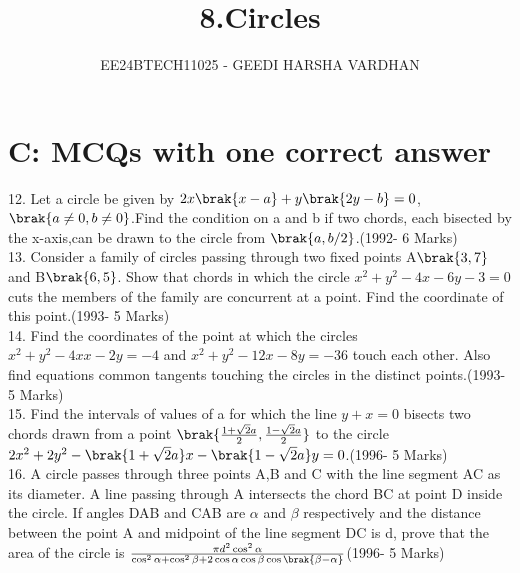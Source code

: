 \documentclass[journal,12pt,twocolumn]{IEEEtran}
\theoremstyle{remark}
\begin{document}

\vspace{3cm}

\title{8.Circles }
\author{EE24BTECH11025 - GEEDI HARSHA VARDHAN }
\maketitle
\newpage
\bigskip
\section{C: MCQs with one correct answer}

\renewcommand{\thefigure}{\theenumi}
\renewcommand{\thetable}{\theenumi}



12. Let a circle be given by $2x\brak{x-a}+y\brak{2y-b}=0$,$\brak{a\neq0,b\neq0}$.Find the condition on a and b if two chords, each bisected by the x-axis,can be drawn to the circle from $\brak{a,b/2}$.\hfill(1992- 6 Marks)\\




13. Consider a family of circles passing through two fixed points A$\brak{3,7}$ and B$\brak{6,5}$. Show that chords in which the circle $x^2+y^2-4x-6y-3=0$ cuts the members of the family are concurrent at a point. Find the coordinate of this point.\hfill(1993- 5 Marks)\\





14. Find the coordinates of the point at which the circles $x^2+y^2-4xx-2y=-4$ and $x^2+y^2-12x-8y=-36$ touch each other. Also find equations common tangents touching the circles in the distinct points.\hfill(1993- 5 Marks)\\


15. Find the intervals of values of a for which the line $y+x=0$ bisects two chords drawn from a point $\brak {\frac{1+\sqrt{2}a}{2},\frac{1-\sqrt{2}a}{2}}$ to the circle $2x^2+2y^2-\brak{1+\sqrt{2}a}x-\brak{1-\sqrt{2}a}y=0$.\hfill(1996- 5 Marks)\\





16. A circle passes through three points A,B and C with the line segment AC as its diameter. A line passing through A intersects the chord BC at point D inside the circle. If angles DAB and CAB are $\alpha$ and $\beta$ respectively and the distance between the point A and midpoint of the line segment DC is d, prove that the area of the circle is $\frac{\pi d^2 \cos^2{\alpha} }{\cos^2{\alpha}+\cos^2{\beta}+ 2\cos{\alpha} \cos{\beta} \cos{\brak{\beta-\alpha}}}$\hfill(1996- 5 Marks)\\
\end{document}
